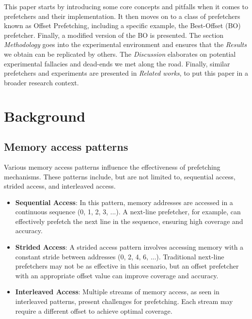 \documentclass[conference]{IEEEtran}
\begin{document}
This paper starts by introducing some core concepts and pitfalls when it comes to prefetchers and their implementation. It then moves on to a class of prefetchers known as Offset Prefetching, including a specific example, the Best-Offset (BO) prefetcher\cite{BOP_2016}. Finally, a modified version of the BO is presented.
The section \textit{Methodology} goes into the experimental environment and ensures that the \textit{Results} we obtain can be replicated by others.
The \textit{Discussion} elaborates on potential experimental fallacies and dead-ends we met along the road. Finally, similar prefetchers and experiments are presented in \textit{Related works}, to put this paper in a broader research context.

\section{Background} %

\subsection{Memory access patterns}
Various memory access patterns influence the effectiveness of prefetching mechanisms. These patterns include, but are not limited to, sequential access, strided access, and interleaved access.

\begin{itemize}
    \item \textbf{Sequential Access}: In this pattern, memory addresses are accessed in a continuous sequence (0, 1, 2, 3, ...). A next-line prefetcher, for example, can effectively prefetch the next line in the sequence, ensuring high coverage and accuracy.
    \item \textbf{Strided Access}: A strided access pattern involves accessing memory with a constant stride between addresses (0, 2, 4, 6, ...). Traditional next-line prefetchers may not be as effective in this scenario, but an offset prefetcher with an appropriate offset value can improve coverage and accuracy.
    \item \textbf{Interleaved Access}: Multiple streams of memory access, as seen in interleaved patterns, present challenges for prefetching. Each stream may require a different offset to achieve optimal coverage.

\end{itemize}
\end{document}
